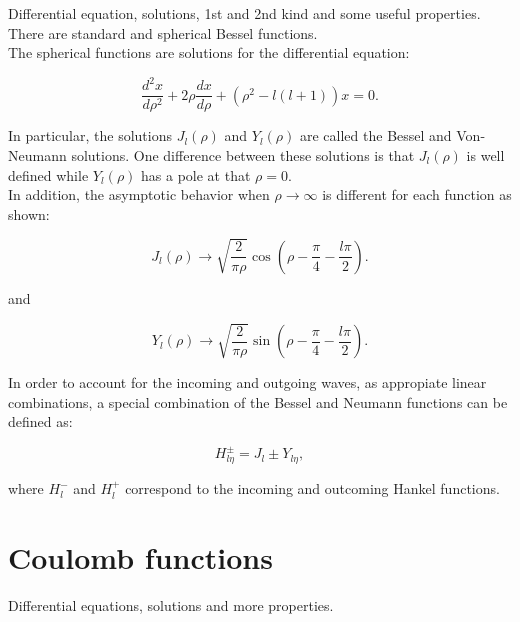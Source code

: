 \documentclass[openany]{book}
\begin{document}
Differential equation, solutions, 1st and 2nd kind and some useful properties. There are standard and spherical Bessel functions. \\

The spherical functions are solutions for the differential equation:

\begin{equation} \label{eq:special_bessel_diffEquation}
	\frac{d^2x}{d\rho^2} + 2\rho \frac{dx}{d\rho} + (\rho^2 - l(l+1))x= 0.
\end{equation}

In particular, the solutions $J_l(\rho)$ and $Y_l(\rho)$ are called the Bessel and Von-Neumann solutions. One difference between these solutions is that $J_l(\rho)$ is well defined while $Y_l(\rho)$  has a pole at that $\rho = 0$.   \\

In addition, the asymptotic behavior when $\rho \rightarrow \infty$ is different for each function as shown:

\begin{equation} \label{eq:special_bessel_J}
	J_l(\rho) \rightarrow \sqrt{ \frac{2}{\pi\rho}}\cos{\left(\rho - \frac{\pi}{4} - \frac{l\pi}{2}\right)}.
\end{equation}

and


\begin{equation} \label{eq:special_bessel_Y}
	Y_l(\rho) \rightarrow \sqrt{\frac{2}{\pi\rho}}\sin{\left(\rho - \frac{\pi}{4} - \frac{l\pi}{2}\right)}.
\end{equation}

In order to account for the incoming and outgoing waves, as appropiate linear combinations, a special combination of the Bessel and Neumann functions can be defined as:

\begin{equation}\label{eq:special_hankel}
	H^{\pm}_{l\eta} = J_{l} \pm Y_{l\eta},
\end{equation}

where $H^{-}_{l}$ and $H^{+}_{l}$ correspond to the incoming and outcoming Hankel functions. \\


\section{Coulomb functions} \label{sec:coulomb}

Differential equations, solutions and more properties.
\end{document}
